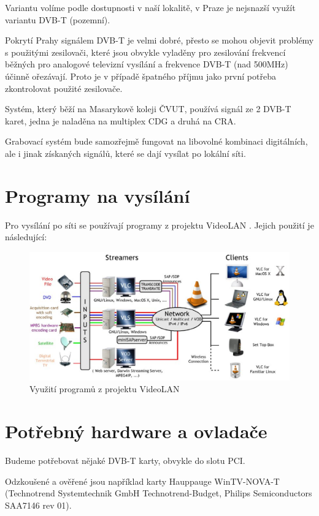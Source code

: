Variantu volíme podle dostupnosti v naší lokalitě, v Praze je nejsnazší využít variantu DVB-T (pozemní).

Pokrytí Prahy signálem DVB-T je velmi dobré, přesto se mohou objevit problémy s použitými zesilovači, které jsou obvykle vyladěny pro zesilování frekvencí běžných pro analogové televizní vysílání a frekvence DVB-T (nad 500MHz) účinně ořezávají. Proto je v případě špatného příjmu jako první potřeba zkontrolovat použité zesilovače.

Systém, který běží na Masarykově koleji ČVUT, používá signál ze 2 DVB-T karet, jedna je naladěna na multiplex CDG a druhá na CRA. 

Grabovací systém bude samozřejmě fungovat na libovolné kombinaci digitálních, ale i jinak získaných signálů, které se dají vysílat po lokální síti.

\section{Programy na vysílání}
Pro vysílání po síti se používají programy z projektu VideoLAN \cite{videolanURL}. Jejich použití je následující:

\begin{figure}[ht]
\begin{center}
\includegraphics[width=15cm]{images/videolan.eps}
\caption{Využití programů z projektu VideoLAN}
\label{fig:videolan}
\end{center}
\end{figure}

\section{Potřebný hardware a ovladače}
Budeme potřebovat nějaké DVB-T karty, obvykle do slotu PCI.

Odzkoušené a ověřené jsou například karty Hauppauge WinTV-NOVA-T (Technotrend Systemtechnik GmbH Technotrend-Budget, Philips Semiconductors SAA7146 rev 01).

